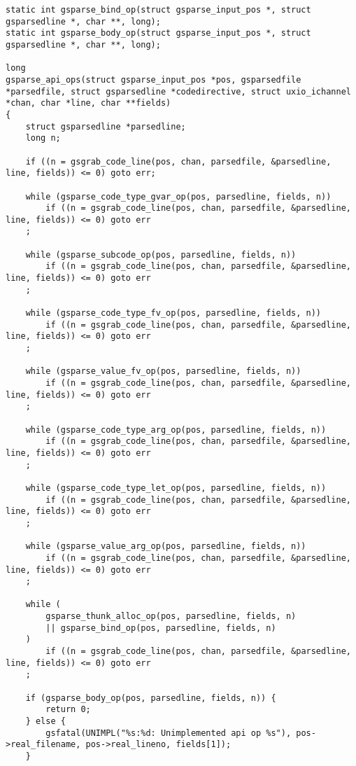 \documentclass{report}
\begin{document}
\begin{verbatim}
static int gsparse_bind_op(struct gsparse_input_pos *, struct gsparsedline *, char **, long);
static int gsparse_body_op(struct gsparse_input_pos *, struct gsparsedline *, char **, long);

long
gsparse_api_ops(struct gsparse_input_pos *pos, gsparsedfile *parsedfile, struct gsparsedline *codedirective, struct uxio_ichannel *chan, char *line, char **fields)
{
    struct gsparsedline *parsedline;
    long n;

    if ((n = gsgrab_code_line(pos, chan, parsedfile, &parsedline, line, fields)) <= 0) goto err;

    while (gsparse_code_type_gvar_op(pos, parsedline, fields, n))
        if ((n = gsgrab_code_line(pos, chan, parsedfile, &parsedline, line, fields)) <= 0) goto err
    ;

    while (gsparse_subcode_op(pos, parsedline, fields, n))
        if ((n = gsgrab_code_line(pos, chan, parsedfile, &parsedline, line, fields)) <= 0) goto err
    ;

    while (gsparse_code_type_fv_op(pos, parsedline, fields, n))
        if ((n = gsgrab_code_line(pos, chan, parsedfile, &parsedline, line, fields)) <= 0) goto err
    ;

    while (gsparse_value_fv_op(pos, parsedline, fields, n))
        if ((n = gsgrab_code_line(pos, chan, parsedfile, &parsedline, line, fields)) <= 0) goto err
    ;

    while (gsparse_code_type_arg_op(pos, parsedline, fields, n))
        if ((n = gsgrab_code_line(pos, chan, parsedfile, &parsedline, line, fields)) <= 0) goto err
    ;

    while (gsparse_code_type_let_op(pos, parsedline, fields, n))
        if ((n = gsgrab_code_line(pos, chan, parsedfile, &parsedline, line, fields)) <= 0) goto err
    ;

    while (gsparse_value_arg_op(pos, parsedline, fields, n))
        if ((n = gsgrab_code_line(pos, chan, parsedfile, &parsedline, line, fields)) <= 0) goto err
    ;

    while (
        gsparse_thunk_alloc_op(pos, parsedline, fields, n)
        || gsparse_bind_op(pos, parsedline, fields, n)
    )
        if ((n = gsgrab_code_line(pos, chan, parsedfile, &parsedline, line, fields)) <= 0) goto err
    ;

    if (gsparse_body_op(pos, parsedline, fields, n)) {
        return 0;
    } else {
        gsfatal(UNIMPL("%s:%d: Unimplemented api op %s"), pos->real_filename, pos->real_lineno, fields[1]);
    }


\end{verbatim}
\end{document}
